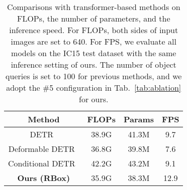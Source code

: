 \documentclass[10pt,twocolumn,letterpaper]{article}
\begin{document}
\begin{table}[tb]
\centering
\begin{tabularx}{1.0\linewidth}{cccc}
\toprule
Method & FLOPs & Params & FPS \\
\midrule
DETR~\cite{carion2020detr}  & 38.9G & 41.3M& 9.7 \\
Deformable DETR~\cite{zhu2020deformable} & 36.8G & 39.8M & 7.6 \\
Conditional DETR~\cite{conditionaldetr} & 42.2G & 43.2M& 9.1 \\
\midrule
\textbf{Ours (RBox)} & 35.9G & 38.3M & 12.9 \\
\bottomrule
\end{tabularx}
\caption{Comparisons with transformer-based methods on FLOPs, the number of parameters, and the inference speed.
For FLOPs, both sides of input images are set to 640.
For FPS, we evaluate all models on the IC15 test dataset with the same inference setting of ours.
The number of object queries is set to 100 for previous methods, and we adopt the \#5 configuration in Tab.~\ref{tab:ablation} for ours.
}
\label{tab:flopsandparams}
\end{table}
\end{document}
